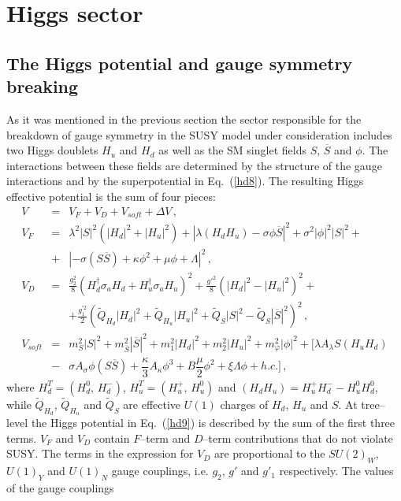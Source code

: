 \documentclass[12pt,a4paper]{article}
\newcommand{\be}{\begin{equation}}
\newcommand{\ee}{\end{equation}}
\newcommand{\ba}{\begin{array}}
\newcommand{\ea}{\end{array}}
\newcommand{\ds}{\displaystyle}
\begin{document}
\section{Higgs sector}
\label{Sec:Higgs-sector}
\subsection{The Higgs potential and gauge symmetry breaking}

As it was mentioned in the previous section the sector responsible for the breakdown of gauge symmetry in the SUSY
model under consideration includes two Higgs doublets $H_u$ and $H_d$ as well as the SM singlet fields $S$,
$\overline{S}$ and $\phi$. The interactions between these fields are determined by the structure of the gauge
interactions and by the superpotential in Eq.~(\ref{hd8}). The resulting Higgs effective potential is the sum
of four pieces:
\be
\ba{rcl}
V&=&V_F+V_D+V_{soft}+\Delta V\, ,\\[2mm]
V_F&=&\lambda^2|S|^2(|H_d|^2+|H_u|^2) + \left|\lambda (H_d H_u) - \sigma \phi \overline{S}\right|^2
+ \sigma^2 |\phi|^2 |S|^2 + \\[2mm]
& + &\left| - \sigma (S \overline{S}) + \kappa \phi^2 + \mu \phi + \Lambda \right|^2\,,\\[2mm]
V_D&=&\ds\frac{g_2^2}{8}\left(H_d^\dagger \sigma_a H_d+H_u^\dagger \sigma_a H_u\right)^2
+\frac{{g'}^2}{8}\left(|H_d|^2-|H_u|^2\right)^2+\\[2mm]
&&+\ds\frac{g^{'2}_1}{2}\left(\tilde{Q}_{H_d} |H_d|^2+\tilde{Q}_{H_u} |H_u|^2+\tilde{Q}_S |S|^2 - \tilde{Q}_S |\overline{S}|^2 \right)^2\,,\\[2mm]
V_{soft}&=&m_{S}^2 |S|^2 + m_{\overline{S}}^2 |\overline{S}|^2 + m_1^2|H_d|^2 + m_2^2|H_u|^2 +
m^2_{\varphi}|\phi|^2+ \biggl[\lambda A_{\lambda} S (H_u H_d) \\[2mm]
&-& \sigma A_{\sigma} \phi (S \overline{S}) + \dfrac{\kappa}{3} A_{\kappa} \phi^3 + B\dfrac{\mu}{2} \phi^2 + \xi \Lambda \phi + h.c.\biggr]\,,
\ea
\label{hd9}
\ee
where $H_d^T=(H_d^0,\,H_d^{-})$, $H_u^T=(H_u^{+},\,H_u^{0})$ and $(H_d H_u)=H_u^{+}H_d^{-}-H_u^{0}H_d^{0}$,
while $\tilde{Q}_{H_d}$, $\tilde{Q}_{H_u}$ and $\tilde{Q}_S$ are effective $U(1)$ charges of $H_d$, $H_u$ and $S$.
At tree--level the Higgs potential in Eq.~(\ref{hd9}) is described by the sum of the first three terms. $V_F$ and $V_D$ contain
$F$--term and $D$--term contributions that do not violate SUSY. The terms in the expression for $V_D$ are proportional to
the $SU(2)_W$, $U(1)_Y$ and $U(1)_{N}$ gauge couplings, i.e. $g_2,\,g'$ and $g'_1$ respectively. The values of the gauge couplings
\end{document}
